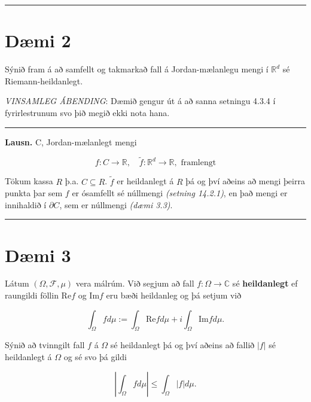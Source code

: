 \documentclass[]{book}
\begin{document}
\begin{center}\rule{0.5\linewidth}{\linethickness}\end{center}

\hypertarget{dmi-2-5}{%
\section*{Dæmi 2}\label{dmi-2-5}}

Sýnið fram á að samfellt og takmarkað fall á Jordan-mælanlegu mengi í \(\mathbb R^d\) sé Riemann-heildanlegt.

\emph{VINSAMLEG ÁBENDING}: Dæmið gengur út á að sanna setningu 4.3.4 í fyrirlestrunum svo þið megið ekki nota hana.

\begin{center}\rule{0.5\linewidth}{\linethickness}\end{center}

\textbf{Lausn.} C, Jordan-mælanlegt mengi

\[
f:C\rightarrow \mathbb R, \quad \tilde f: \mathbb R^d \rightarrow \mathbb R, \text{ framlengt}
\]

Tökum kassa \(R\) þ.a. \(C\subseteq R\). \(\tilde f\) er heildanlegt á \(R\) þá og því aðeins að mengi þeirra punkta þar sem \(f\) er ósamfellt sé núllmengi \emph{(setning 14.2.1)}, en það mengi er innihaldið í \(\partial C\), sem er núllmengi \emph{(dæmi 3.3)}.

\begin{center}\rule{0.5\linewidth}{\linethickness}\end{center}

\hypertarget{dmi-3-5}{%
\section*{Dæmi 3}\label{dmi-3-5}}

Látum \((\Omega,\mathcal F, \mu)\) vera málrúm. Við segjum að fall \(f:\Omega\rightarrow\mathbb C\) sé \textbf{heildanlegt} ef raungildi föllin \(\text{Re}f\) og \(\text{Im}f\) eru bæði heildanleg og þá setjum við

\[
\int_\Omega fd\mu := \int_\Omega \text{Re}fd\mu + i\int_\Omega \text{Im}fd\mu.
\]

Sýnið að tvinngilt fall \(f\) á \(\Omega\) sé heildanlegt þá og því aðeins að fallið \(|f|\) sé heildanlegt á \(\Omega\) og sé svo þá gildi

\[
\left|\int_\Omega fd\mu\right| \leq \int_\Omega |f|d\mu.
\]
\end{document}
